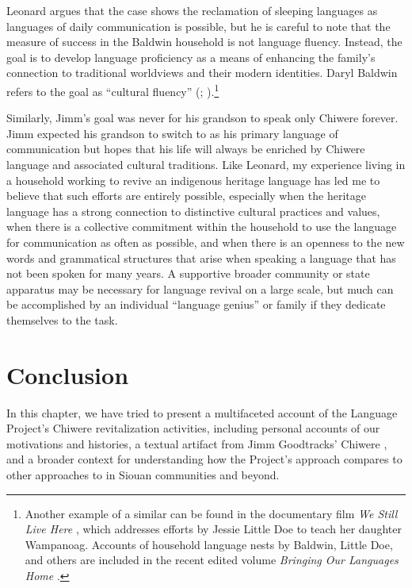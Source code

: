 \documentclass[output=paper]{LSP/langsci}
\begin{document}
Leonard argues that the  case shows the reclamation of sleeping languages as languages of daily communication is possible, but he is careful to note that the measure of success in the Baldwin household is not  language fluency. Instead, the goal is to develop language proficiency as a means of enhancing the family's connection to traditional worldviews and their modern  identities. Daryl Baldwin refers to the goal as ``cultural fluency'' (\citealt[36--37]{Leonard2007}; \citeyear[139--140]{Leonard2011}).\footnote{Another example of a similar  can be found in the documentary film \emph{We Still Live Here} \citep{Makepeace2011}, which addresses efforts by Jessie Little Doe to teach her daughter Wampanoag. Accounts of household language nests by Baldwin, Little Doe, and others are included in the recent edited volume \emph{Bringing Our Languages Home} \citep{Hinton2013}.} 

Similarly, Jimm's goal was never for his grandson to speak only Chiwere forever. Jimm expected his grandson to switch to  as his primary language of communication but hopes that his life will always be enriched by Chiwere language and associated cultural traditions. Like Leonard, my experience living in a household working to revive an indigenous heritage language has led me to believe that such efforts are entirely possible, especially when the heritage language has a strong connection to distinctive cultural practices and values, when there is a collective commitment within the household to use the language for communication as often as possible, and when there is an openness to the new words and grammatical structures that arise when speaking a language that has not been spoken for many years. A supportive broader community or state apparatus may be necessary for language revival on a large scale, but much can be accomplished by an individual ``language genius'' or family if they dedicate themselves to the task.

\section{Conclusion}
In this chapter, we have tried to present a multifaceted account of the  Language Project's Chiwere revitalization activities, including personal accounts of our motivations and histories, a textual artifact from Jimm Goodtracks' Chiwere , and a broader context for understanding how the Project's approach compares to other approaches to  in Siouan communities and beyond.
\end{document}
